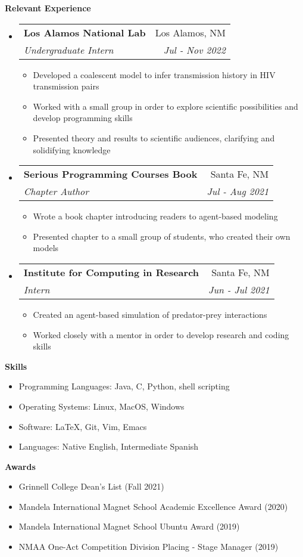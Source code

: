 \documentclass[letterpaper,11pt]{article}
\makeatletter
\newcommand{\resitem}[1]{\item #1 \vspace{-2pt}}
\newcommand{\resheading}[1]{{\large \colorbox{mygrey}{\begin{minipage}{\textwidth}{\textbf{#1 \vphantom{p\^{E}}}}\end{minipage}}}}
\newcommand{\ressubheading}[4]{
\begin{tabular*}{7.0in}{l@{\extracolsep{\fill}}r}
		\textbf{#1} & #2 \\
		\textit{#3} & \textit{#4} \\
\end{tabular*}\vspace{-6pt}}
\makeatother
\begin{document}
\resheading{Relevant Experience}
\begin{itemize}
\item
    \ressubheading{Los Alamos National Lab}{Los Alamos, NM}{Undergraduate Intern}{Jul - Nov 2022}
	\begin{itemize}
		\resitem{Developed a coalescent model to infer transmission history in HIV transmission pairs}
		\resitem{Worked with a small group in order to explore scientific possibilities and develop programming skills}
		\resitem{Presented theory and results to scientific audiences, clarifying and solidifying knowledge}
	\end{itemize}

\item
    \ressubheading{Serious Programming Courses Book}{Santa Fe, NM}{Chapter Author}{Jul - Aug 2021}
	\begin{itemize}
		\resitem{Wrote a book chapter introducing readers to agent-based modeling}
		\resitem{Presented chapter to a small group of students, who created their own models}
	\end{itemize}

\item
    \ressubheading{Institute for Computing in Research}{Santa Fe, NM}{Intern}{Jun - Jul 2021}
	\begin{itemize}
		\resitem{Created an agent-based simulation of predator-prey interactions}
		\resitem{Worked closely with a mentor in order to develop research and coding skills} 
	\end{itemize}
\end{itemize}


\resheading{Skills}
\begin{itemize}
    \item
        {Programming Languages: Java, C, Python, shell scripting}
    \item
        {Operating Systems: Linux, MacOS, Windows}
    \item
	{Software: \LaTeX, Git, Vim, Emacs}
    \item
        {Languages: Native English, Intermediate Spanish}
\end{itemize}


\resheading{Awards}
\begin{itemize}
    \item
	{Grinnell College Dean's List (Fall 2021)}
    \item
        {Mandela International Magnet School Academic Excellence Award (2020)}
    \item
        {Mandela International Magnet School Ubuntu Award (2019)}
    \item
        {NMAA One-Act Competition Division Placing - Stage Manager (2019)}
\end{itemize}
\end{document}
